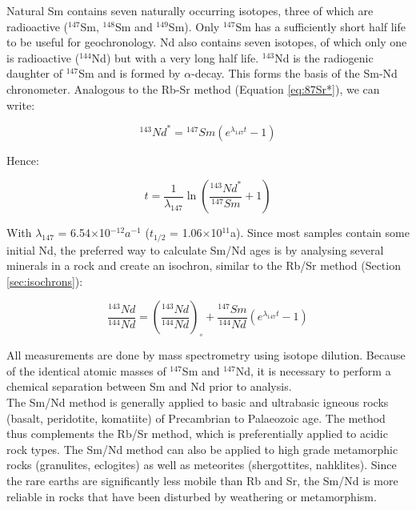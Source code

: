 \documentclass{book}
\begin{document}
Natural Sm contains seven naturally occurring isotopes, three of which
are radioactive ($^{147}$Sm, $^{148}$Sm and $^{149}$Sm). Only
$^{147}$Sm has a sufficiently short half life to be useful for
geochronology.  Nd also contains seven isotopes, of which only one is
radioactive ($^{144}$Nd) but with a very long half life. $^{143}$Nd is
the radiogenic daughter of $^{147}$Sm and is formed by
$\alpha$-decay. This forms the basis of the Sm-Nd chronometer.
Analogous to the Rb-Sr method (Equation \ref{eq:87Sr*}), we can write:

\begin{equation}
^{143}Nd^* = {}^{147}Sm (e^{\lambda_{147} t} - 1)
\label{eq:144Nd*}
\end{equation}

Hence:

\begin{equation}
t = \frac{1}{\lambda_{147}}
\ln\left(\frac{^{143}Nd^*}{^{147}Sm} + 1 \right)
\label{eq:tNd}
\end{equation}

With $\lambda_{147}$ = 6.54$\times$10$^{-12} a^{-1}$ ($t_{1/2}$ =
1.06$\times$10$^{11}$a).  Since most samples contain some initial Nd,
the preferred way to calculate Sm/Nd ages is by analysing several
minerals in a rock and create an isochron, similar to the Rb/Sr method
(Section \ref{sec:isochrons}):

\begin{equation}
\frac{^{143}Nd}{^{144}Nd} =
\left(\frac{^{143}Nd}{^{144}Nd}\right)_{\circ} +
\frac{^{147}Sm}{^{144}Nd} \left(e^{\lambda_{147}t} -
1\right)
\label{eq:143Nd147Nd}
\end{equation}

All measurements are done by mass spectrometry using isotope dilution.
Because of the identical atomic masses of $^{147}$Sm and $^{147}$Nd,
it is necessary to perform a chemical separation between Sm and Nd
prior to analysis.\\

The Sm/Nd method is generally applied to basic and ultrabasic igneous
rocks (basalt, peridotite, komatiite) of Precambrian to Palaeozoic
age. The method thus complements the Rb/Sr method, which is
preferentially applied to acidic rock types. The Sm/Nd method can also
be applied to high grade metamorphic rocks (granulites, eclogites) as
well as meteorites (shergottites, nahklites). Since the rare earths
are significantly less mobile than Rb and Sr, the Sm/Nd is more
reliable in rocks that have been disturbed by weathering or
metamorphism.
\end{document}

